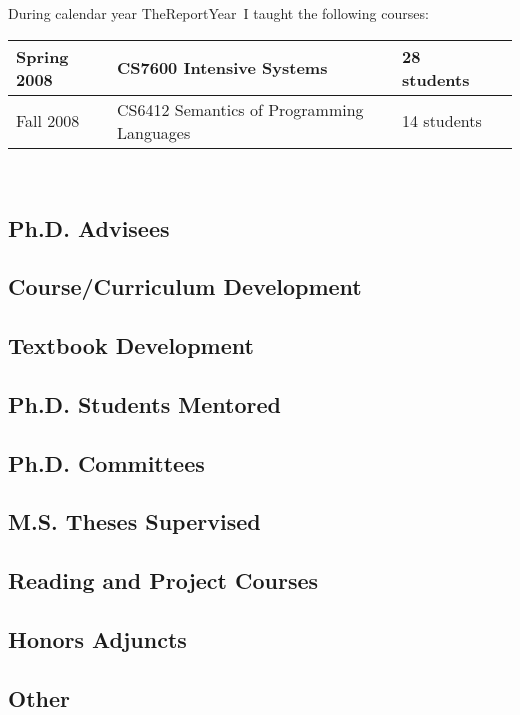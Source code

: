 \documentclass[12pt]{article}
\def\reportyear{TheReportYear}
\begin{document}
During calendar year \reportyear\ I taught the following courses:

\def\course#1#2#3{{#1}&{#2}&{#3}\\ \hline}
\begin{tabular}{|l|l|l|l|}
\hline
\course{Spring 2008}
  {CS7600 Intensive Systems}
  {28 students}
\course{Fall 2008}
  {CS6412 Semantics of Programming Languages}
  {14 students}
\end{tabular}\\

\subsection{Ph.D. Advisees}

\subsection{Course/Curriculum Development}

\subsection{Textbook Development}

\subsection{Ph.D. Students Mentored}

\subsection{Ph.D. Committees}

\subsection{M.S. Theses Supervised}

\subsection{Reading and Project Courses}

\subsection{Honors Adjuncts}

\subsection{Other}
\end{document}
